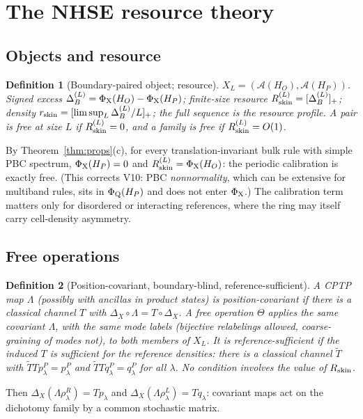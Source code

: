\documentclass[11pt]{article}
\newtheorem{definition}{Definition}
\newcommand{\Rskin}{R_{\rm skin}}
\newcommand{\rskin}{r_{\rm skin}}
\newcommand{\PhiQ}{\Phi_{\rm Q}}
\newcommand{\PhiX}{\Phi_{\rm X}}
\begin{document}
\section{The NHSE resource theory}
\subsection{Objects and resource}
\begin{definition}[Boundary-paired object; resource]
$X_L=(\mathcal A(H_O),\mathcal A(H_P))$. Signed excess $\Delta_B^{(L)}=\PhiX(H_O)-\PhiX(H_P)$; finite-size resource $\Rskin^{(L)}=[\Delta_B^{(L)}]_+$; density $\rskin=[\limsup_L\Delta_B^{(L)}/L]_+$; the full sequence is the resource profile.
A pair is \emph{free at size $L$} if $\Rskin^{(L)}=0$, and a family is \emph{free} if $\Rskin^{(L)}=O(1)$.
\end{definition}
By Theorem~\ref{thm:props}(c), for every translation-invariant bulk rule with simple PBC spectrum, $\PhiX(H_P)=0$ and $\Rskin^{(L)}=\PhiX(H_O)$: the periodic calibration is exactly free. (This corrects V10: PBC \emph{nonnormality}, which can be extensive for multiband rules, sits in $\PhiQ(H_P)$ and does not enter $\PhiX$.)
The calibration term matters only for disordered or interacting references, where the ring may itself carry cell-density asymmetry.

\subsection{Free operations}
\begin{definition}[Position-covariant, boundary-blind, reference-sufficient]
A CPTP map $\Lambda$ (possibly with ancillas in product states) is \emph{position-covariant} if there is a classical channel $T$ with $\Delta_X\circ\Lambda=T\circ\Delta_X$.
A free operation $\Theta$ applies the \emph{same} covariant $\Lambda$, with the same mode labels (bijective relabelings allowed, coarse-graining of modes not), to both members of $X_L$. It is \emph{reference-sufficient} if the induced $T$ is sufficient for the reference densities: there is a classical channel $\tilde T$ with $\tilde TTp^P_\lambda=p^P_\lambda$ and $\tilde TTq^P_\lambda=q^P_\lambda$ for all $\lambda$.
No condition involves the value of $\Rskin$.
\end{definition}
Then $\Delta_X(\Lambda\rho^{R}_\lambda)=Tp_\lambda$ and $\Delta_X(\Lambda\rho^{L}_\lambda)=Tq_\lambda$: covariant maps act on the dichotomy family by a common stochastic matrix.
\end{document}
